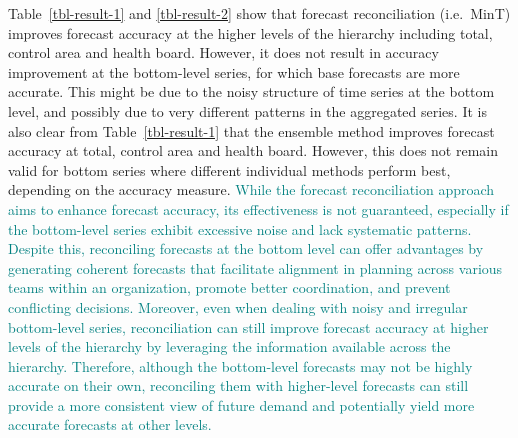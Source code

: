 \documentclass[
  authoryear,
  preprint,
  3p]{elsarticle}
\begin{document}
Table~\ref{tbl-result-1} and \ref{tbl-result-2} show that forecast
reconciliation (i.e.~MinT) improves forecast accuracy at the higher
levels of the hierarchy including total, control area and health board.
However, it does not result in accuracy improvement at the bottom-level
series, for which base forecasts are more accurate. This might be due to
the noisy structure of time series at the bottom level, and possibly due
to very different patterns in the aggregated series. It is also clear
from Table~\ref{tbl-result-1} that the ensemble method improves forecast
accuracy at total, control area and health board. However, this does not
remain valid for bottom series where different individual methods
perform best, depending on the accuracy measure.
\textcolor{teal}{While the forecast reconciliation approach aims to enhance forecast accuracy, its effectiveness is not guaranteed, especially if the bottom-level series exhibit excessive noise and lack systematic patterns. Despite this, reconciling forecasts at the bottom level can offer advantages by generating coherent forecasts that facilitate alignment in planning across various teams within an organization, promote better coordination, and prevent conflicting decisions. Moreover, even when dealing with noisy and irregular bottom-level series, reconciliation can still improve forecast accuracy at higher levels of the hierarchy by leveraging the information available across the hierarchy. Therefore, although the bottom-level forecasts may not be highly accurate on their own, reconciling them with higher-level forecasts can still provide a more consistent view of future demand and potentially yield more accurate forecasts at other levels.}
\end{document}

